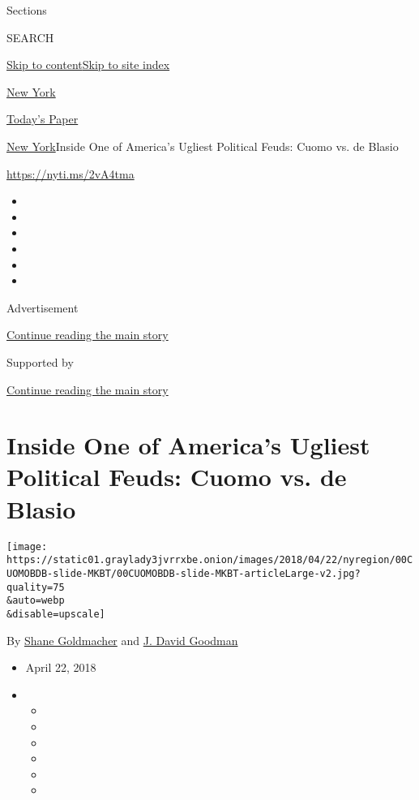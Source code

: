 Sections

SEARCH

\protect\hyperlink{site-content}{Skip to
content}\protect\hyperlink{site-index}{Skip to site index}

\href{https://www.nytimes3xbfgragh.onion/section/nyregion}{New York}

\href{https://myaccount.nytimes3xbfgragh.onion/auth/login?response_type=cookie\&client_id=vi}{}

\href{https://www.nytimes3xbfgragh.onion/section/todayspaper}{Today's
Paper}

\href{/section/nyregion}{New York}\textbar{}Inside One of America's
Ugliest Political Feuds: Cuomo vs. de Blasio

\url{https://nyti.ms/2vA4tma}

\begin{itemize}
\item
\item
\item
\item
\item
\item
\end{itemize}

Advertisement

\protect\hyperlink{after-top}{Continue reading the main story}

Supported by

\protect\hyperlink{after-sponsor}{Continue reading the main story}

\hypertarget{inside-one-of-americas-ugliest-political-feuds-cuomo-vs-de-blasio}{%
\section{Inside One of America's Ugliest Political Feuds: Cuomo vs. de
Blasio}\label{inside-one-of-americas-ugliest-political-feuds-cuomo-vs-de-blasio}}

\texttt{[image: https://static01.graylady3jvrrxbe.onion/images/2018/04/22/nyregion/00CUOMOBDB-slide-MKBT/00CUOMOBDB-slide-MKBT-articleLarge-v2.jpg?quality=75\\\&auto=webp\\\&disable=upscale]}

By \href{https://www.nytimes3xbfgragh.onion/by/shane-goldmacher}{Shane
Goldmacher} and
\href{http://www.nytimes3xbfgragh.onion/by/j-david-goodman}{J. David
Goodman}

\begin{itemize}
\item
  April 22, 2018
\item
  \begin{itemize}
  \item
  \item
  \item
  \item
  \item
  \item
  \end{itemize}
\end{itemize}

